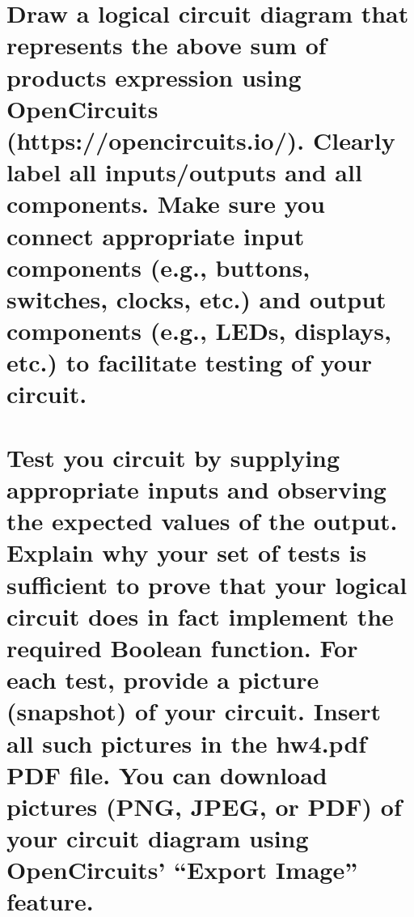 \documentclass{article}
\begin{document}
\section{Draw a logical circuit diagram that represents the above sum of products expression using OpenCircuits (https://opencircuits.io/). Clearly label all inputs/outputs and all components. Make sure you connect appropriate input components (e.g., buttons, switches, clocks, etc.) and output components (e.g., LEDs, displays, etc.) to facilitate testing of your circuit.}\newline
{}\newline


\section{Test you circuit by supplying appropriate inputs and observing the expected values of the
output. Explain why your set of tests is sufficient to prove that your logical circuit does in
fact implement the required Boolean function. For each test, provide a picture (snapshot) of
your circuit. Insert all such pictures in the hw4.pdf PDF file. You can download pictures
(PNG, JPEG, or PDF) of your circuit diagram using OpenCircuits’ “Export Image” feature.}
\large
\end{document}
